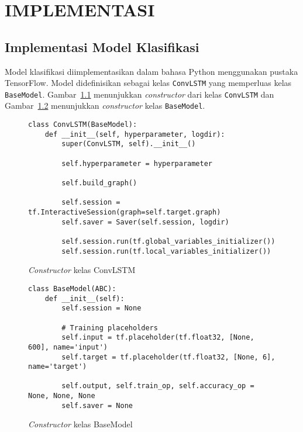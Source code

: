 \chapter{IMPLEMENTASI}

\section{Implementasi Model Klasifikasi}
Model klasifikasi diimplementasikan dalam bahasa Python menggunakan pustaka TensorFlow. Model didefinisikan sebagai kelas \texttt{ConvLSTM} yang memperluas kelas \texttt{BaseModel}. Gambar~\ref{listing:har-ConvLSTM-constructor} menunjukkan \textit{constructor} dari kelas \texttt{ConvLSTM} dan Gambar~\ref{listing:har-BaseModel-constructor} menunjukkan \textit{constructor} kelas \texttt{BaseModel}.

\begin{figure}[h]
\begin{verbatim}
class ConvLSTM(BaseModel):
    def __init__(self, hyperparameter, logdir):
        super(ConvLSTM, self).__init__()

        self.hyperparameter = hyperparameter

        self.build_graph()

        self.session = tf.InteractiveSession(graph=self.target.graph)
        self.saver = Saver(self.session, logdir)

        self.session.run(tf.global_variables_initializer())
        self.session.run(tf.local_variables_initializer())
\end{verbatim}
\caption{\textit{Constructor} kelas ConvLSTM}
\label{listing:har-ConvLSTM-constructor}
\end{figure}

\begin{figure}[h]
\begin{verbatim}
class BaseModel(ABC):
    def __init__(self):
        self.session = None

        # Training placeholders
        self.input = tf.placeholder(tf.float32, [None, 600], name='input')
        self.target = tf.placeholder(tf.float32, [None, 6], name='target')

        self.output, self.train_op, self.accuracy_op = None, None, None
        self.saver = None
\end{verbatim}
\caption{\textit{Constructor} kelas BaseModel}
\label{listing:har-BaseModel-constructor}
\end{figure}

